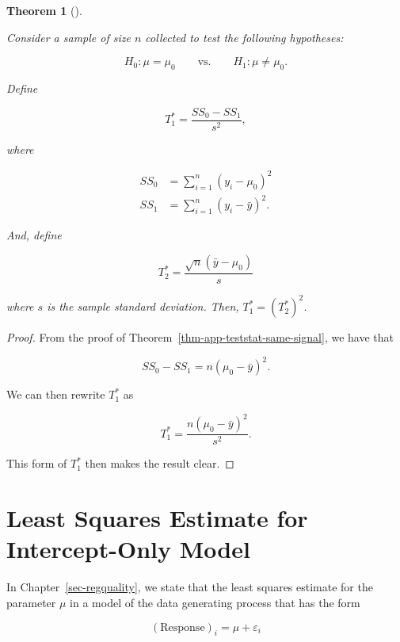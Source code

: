 \documentclass[
  letterpaper,
  DIV=11,
  numbers=noendperiod]{scrreprt}
\theoremstyle{plain}
\newtheorem{theorem}{Theorem}[chapter]
\theoremstyle{definition}
\theoremstyle{definition}
\theoremstyle{remark}
\begin{document}
\begin{theorem}[]\protect\hypertarget{thm-app-teststat-two-statistics}{}\label{thm-app-teststat-two-statistics}

Consider a sample of size \(n\) collected to test the following
hypotheses:

\[H_0: \mu = \mu_0 \qquad \text{vs.} \qquad H_1: \mu \neq \mu_0.\]

Define

\[T_1^* = \frac{SS_0 - SS_1}{s^2},\]

where

\[
\begin{aligned}
  SS_0 &= \sum_{i=1}^{n} \left(y_i - \mu_0\right)^2 \\
  SS_1 &= \sum_{i=1}^{n} \left(y_i - \bar{y}\right)^2.
\end{aligned}
\]

And, define

\[T_2^* = \frac{\sqrt{n} \left(\bar{y} - \mu_0\right)}{s}\]

where \(s\) is the sample standard deviation. Then,
\(T_1^* = \left(T_2^*\right)^2\).

\end{theorem}

\begin{proof}

From the proof of Theorem~\ref{thm-app-teststat-same-signal}, we have
that

\[SS_0 - SS_1 = n \left(\mu_0 - \bar{y}\right)^2.\]

We can then rewrite \(T_1^*\) as

\[T_1^* = \frac{n\left(\mu_0 - \bar{y}\right)^2}{s^2}.\]

This form of \(T_1^*\) then makes the result clear.

\end{proof}

\hypertarget{least-squares-estimate-for-intercept-only-model}{%
\section{Least Squares Estimate for Intercept-Only
Model}\label{least-squares-estimate-for-intercept-only-model}}

In Chapter~\ref{sec-regquality}, we state that the least squares
estimate for the parameter \(\mu\) in a model of the data generating
process that has the form

\[(\text{Response})_i = \mu + \varepsilon_i\]
\end{document}
